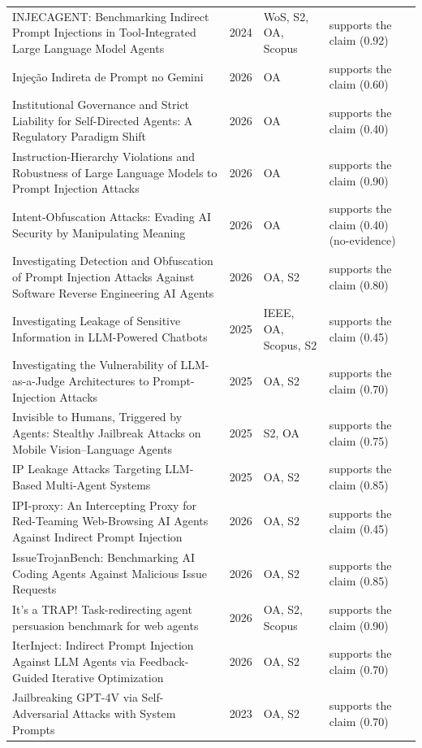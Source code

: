 \begin{longtable}{@{}%
  >{\raggedright\arraybackslash}p{}c%
  >{\raggedright\arraybackslash}p{}%
  >{\raggedright\arraybackslash}p{}@{}}
INJECAGENT: Benchmarking Indirect Prompt Injections in Tool-Integrated Large Language Model Agents & 2024 & WoS, S2, OA, Scopus & supports the claim (0.92) \\
Injeção Indireta de Prompt no Gemini & 2026 & OA & supports the claim (0.60) \\
Institutional Governance and Strict Liability for Self-Directed Agents: A Regulatory Paradigm Shift & 2026 & OA & supports the claim (0.40) \\
Instruction-Hierarchy Violations and Robustness of Large Language Models to Prompt Injection Attacks & 2026 & OA & supports the claim (0.90) \\
Intent-Obfuscation Attacks: Evading AI Security by Manipulating Meaning & 2026 & OA & supports the claim (0.40) (no-evidence) \\
Investigating Detection and Obfuscation of Prompt Injection Attacks Against Software Reverse Engineering AI Agents & 2026 & OA, S2 & supports the claim (0.80) \\
Investigating Leakage of Sensitive Information in LLM-Powered Chatbots & 2025 & IEEE, OA, Scopus, S2 & supports the claim (0.45) \\
Investigating the Vulnerability of LLM-as-a-Judge Architectures to Prompt-Injection Attacks & 2025 & OA, S2 & supports the claim (0.70) \\
Invisible to Humans, Triggered by Agents: Stealthy Jailbreak Attacks on Mobile Vision--Language Agents & 2025 & S2, OA & supports the claim (0.75) \\
IP Leakage Attacks Targeting LLM-Based Multi-Agent Systems & 2025 & OA, S2 & supports the claim (0.85) \\
IPI-proxy: An Intercepting Proxy for Red-Teaming Web-Browsing AI Agents Against Indirect Prompt Injection & 2026 & OA, S2 & supports the claim (0.45) \\
IssueTrojanBench: Benchmarking AI Coding Agents Against Malicious Issue Requests & 2026 & OA, S2 & supports the claim (0.85) \\
It's a TRAP! Task-redirecting agent persuasion benchmark for web agents & 2026 & OA, S2, Scopus & supports the claim (0.90) \\
IterInject: Indirect Prompt Injection Against LLM Agents via Feedback-Guided Iterative Optimization & 2026 & OA, S2 & supports the claim (0.70) \\
Jailbreaking GPT-4V via Self-Adversarial Attacks with System Prompts & 2023 & OA, S2 & supports the claim (0.70) \\

\end{longtable}
